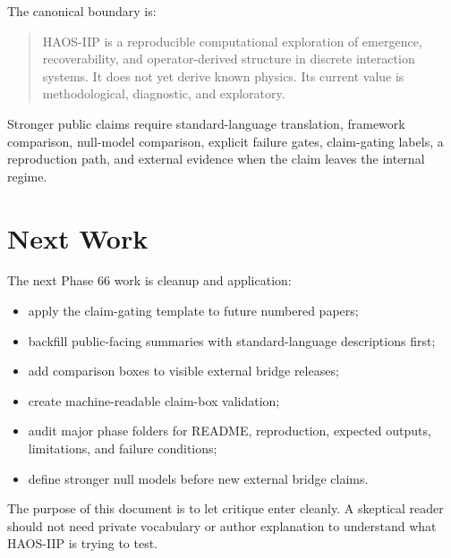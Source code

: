 \documentclass[11pt]{article}
\begin{document}
The canonical boundary is:

\begin{quote}
HAOS-IIP is a reproducible computational exploration of emergence, recoverability, and operator-derived structure in discrete interaction systems. It does not yet derive known physics. Its current value is methodological, diagnostic, and exploratory.
\end{quote}

Stronger public claims require standard-language translation, framework comparison, null-model comparison, explicit failure gates, claim-gating labels, a reproduction path, and external evidence when the claim leaves the internal regime.

\section{Next Work}

The next Phase 66 work is cleanup and application:

\begin{itemize}
\item apply the claim-gating template to future numbered papers;
\item backfill public-facing summaries with standard-language descriptions first;
\item add comparison boxes to visible external bridge releases;
\item create machine-readable claim-box validation;
\item audit major phase folders for README, reproduction, expected outputs, limitations, and failure conditions;
\item define stronger null models before new external bridge claims.
\end{itemize}

The purpose of this document is to let critique enter cleanly. A skeptical reader should not need private vocabulary or author explanation to understand what HAOS-IIP is trying to test.
\end{document}
